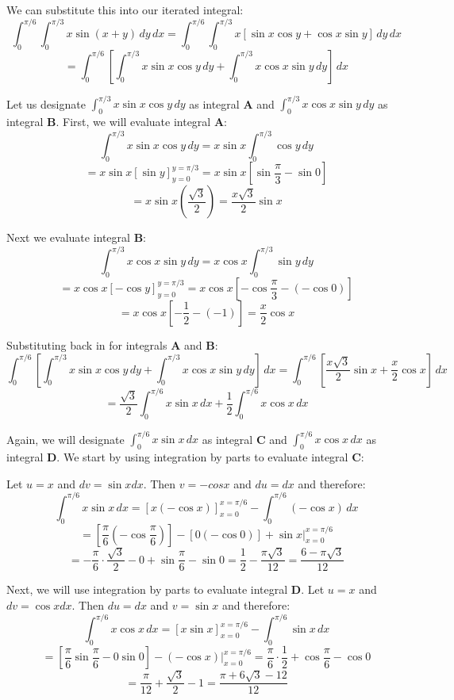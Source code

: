 \begin{Answer}[ref = fubini_2]
\begin{enumerate}
We can substitute this into our iterated integral:
$$\int_0^{\pi/6} \int_0^{\pi/3} x \sin{ \left( x + y \right) }\,dy\,dx = 
\int_0^{\pi/6} \int_0^{\pi/3} x \left[ \sin{x}\cos{y} + \cos{x}\sin{y} 
\right]\,dy\,dx$$
$$= \int_0^{\pi/6} \left[ \int_0^{\pi/3} x \sin{x} \cos{y}\,dy + \int_0^{\pi/3}
x \cos{x} \sin{y}\,dy \right]\,dx$$

Let us designate $\int_0^{\pi/3} x \sin{x} \cos{y}\,dy$ as integral \textbf{A} 
and $\int_0^{\pi/3} x \cos{x} \sin{y}\,dy$ as integral \textbf{B}. First, we 
will evaluate integral \textbf{A}:
$$\int_0^{\pi/3} x \sin{x} \cos{y}\,dy = x \sin{x} \int_0^{\pi/3} \cos{y}\,dy$$
$$= x \sin{x} \left[ \sin{y} \right]_{y = 0}^{y = \pi/3} = x \sin{x} \left[ 
\sin{\frac{\pi}{3}} - \sin{0} \right]$$
$$= x \sin{x} \left( \frac{\sqrt{3}}{2} \right) = \frac{x \sqrt{3}}{2} \sin{x}$$

Next we evaluate integral \textbf{B}:
$$\int_0^{\pi/3} x \cos{x} \sin{y}\,dy = x \cos{x} \int_0^{\pi/3} \sin{y}\,dy$$
$$= x \cos{x} \left[ - \cos{y} \right]_{y = 0}^{y = \pi/3} = x \cos{x} \left[ -
\cos{\frac{\pi}{3}} - \left( - \cos{0} \right) \right]$$
$$= x\cos{x} \left[ - \frac{1}{2} - (-1) \right] = \frac{x}{2}\cos{x}$$

Substituting back in for integrals \textbf{A} and \textbf{B}:
$$\int_0^{\pi/6} \left[ \int_0^{\pi/3} x \sin{x} \cos{y}\,dy + \int_0^{\pi/3} 
x \cos{x} \sin{y}\,dy \right]\,dx = \int_0^{\pi/6} \left[ \frac{x \sqrt{3}}{2} 
\sin{x} + \frac{x}{2}\cos{x} \right]\,dx$$
$$= \frac{\sqrt{3}}{2} \int_0^{\pi/6} x \sin{x}\,dx + \frac{1}{2} \int_0^{
\pi/6} x \cos{x}\,dx$$

Again, we will designate $\int_0^{\pi/6} x \sin{x}\,dx$ as integral \textbf{C} 
and $\int_0^{\pi/6} x \cos{x}\,dx$ as integral \textbf{D}. We start by using 
integration by parts to evaluate integral \textbf{C}:

Let $u = x$ and $dv = \sin{x} dx$. Then $v = -cos{x}$ and $du = dx$ and 
therefore:
$$\int_0^{\pi/6} x \sin{x}\,dx = \left[ x \left(- \cos{x} \right) \right]_{x = 
0}^{x = \pi/6} - \int_0^{\pi/6} \left( - \cos{x} \right)\,dx$$
$$= \left[ \frac{\pi}{6} \left(- \cos{\frac{\pi}{6}} \right) \right] - \left[ 
0 \left(- \cos{0} \right) \right] + \sin{x}|_{x = 0}^{x = \pi/6}$$
$$= -\frac{\pi}{6} \cdot \frac{\sqrt{3}}{2} - 0 + \sin{\frac{\pi}{6}} - 
\sin{0} = \frac{1}{2} - \frac{\pi \sqrt{3}}{12} = \frac{6 - \pi \sqrt{3}}{12}$$

Next, we will use integration by parts to evaluate integral \textbf{D}. Let $u 
= x$ and $dv = \cos{x} dx$. Then $du = dx$ and $v = \sin{x}$ and therefore:
$$\int_0^{\pi/6} x \cos{x}\,dx = \left[ x \sin{x} \right]_{x = 0}^{x = \pi/6} -
\int_0^{\pi/6} \sin{x}\,dx$$
$$= \left[ \frac{\pi}{6}\sin{\frac{\pi}{6}} - 0\sin{0} \right] - \left( - 
\cos{x} \right)|_{x = 0}^{x = \pi/6} = \frac{\pi}{6} \cdot \frac{1}{2} + 
\cos{\frac{\pi}{6}} - \cos{0}$$
$$= \frac{\pi}{12} + \frac{\sqrt{3}}{2} - 1 = \frac{\pi + 6\sqrt{3} - 12}{12}$$


\end{enumerate}
\end{Answer}
